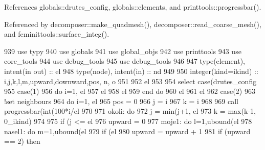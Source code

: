 References globals\+::drutes\+\_\+config, globals\+::elements, and printtools\+::progressbar().



Referenced by decomposer\+::make\+\_\+quadmesh(), decomposer\+::read\+\_\+coarse\+\_\+mesh(), and feminittools\+::surface\+\_\+integ().


\begin{DoxyCode}
939       \textcolor{keywordtype}{use }typy
940       \textcolor{keywordtype}{use }globals
941       \textcolor{keywordtype}{use }global_objs
942       \textcolor{keywordtype}{use }printtools
943       \textcolor{keywordtype}{use }core_tools
944       \textcolor{keywordtype}{use }debug_tools
945       \textcolor{keywordtype}{use }debug_tools
946 
947       \textcolor{keywordtype}{type}(element), \textcolor{keywordtype}{intent(in out)} :: el
948       \textcolor{keywordtype}{type}(node), \textcolor{keywordtype}{intent(in)} :: nd
949       
950       \textcolor{keywordtype}{integer(kind=ikind)} :: i,j,k,l,m,upward,downward,pos, n, o
951       
952       el%
953       
954       \textcolor{keywordflow}{select case}(drutes_config%
955         \textcolor{keywordflow}{case}(1)
956           \textcolor{keywordflow}{do} i=1, el%
957             el%
958             el%
959 \textcolor{keywordflow}{           end do}
960            el%
961            el%
962         \textcolor{keywordflow}{case}(2)
963             !set neighbours
964             \textcolor{keywordflow}{do} i=1, el%
965               pos = 0
966               j = i
967               k = i
968 
969               \textcolor{keyword}{call }progressbar(int(100*i/el%
970 
971               okoli: \textcolor{keywordflow}{do} 
972                         j = min(j+1, el%
973                         k = max(k-1, 0\_ikind)
974 
975                         \textcolor{keywordflow}{if} (j <= el%
976                           upward = 0
977                           moje1: \textcolor{keywordflow}{do} l=1,ubound(el%
978                                     nasel1: \textcolor{keywordflow}{do} m=1,ubound(el%
979                                             \textcolor{keywordflow}{if} (el%
980                                               upward = upward + 1
981                                               \textcolor{keywordflow}{if} (upward == 2) \textcolor{keywordflow}{then} 

\end{DoxyCode}
